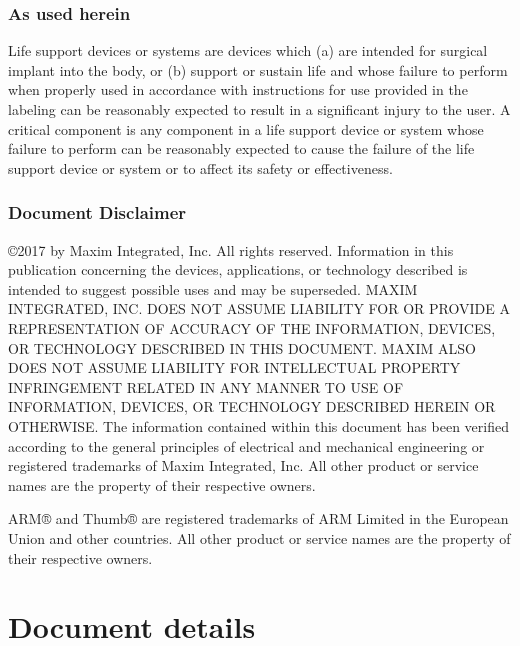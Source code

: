 \documentclass[twoside]{book}
\newcommand\docyear{2017 }
\newcommand{\+}{\discretionary{\mbox{\scriptsize$\hookleftarrow$}}{}{}}
\newcommand{\clearemptydoublepage}{%
  \newpage{\pagestyle{empty}\cleardoublepage}%
}
\let\cleardoublepage\clearpage
\begin{document}
\subsection*{As used herein}
Life support devices or systems are devices which (a) are intended for surgical implant into the body, or (b) support or sustain life and whose failure to perform when properly used in accordance with instructions for use provided in the labeling can be reasonably expected to result in a significant injury to the user. A critical component is any component in a life support device or system whose failure to perform can be reasonably expected to cause the failure of the life support device or system or to affect its safety or effectiveness.

\subsection*{Document Disclaimer}
©\docyear by Maxim Integrated, Inc. All rights reserved. Information in this publication concerning the devices, applications, or technology described is intended to suggest possible uses and may be superseded. MAXIM INTEGRATED, INC. DOES NOT ASSUME LIABILITY FOR OR PROVIDE A REPRESENTATION OF ACCURACY OF THE INFORMATION, DEVICES, OR TECHNOLOGY DESCRIBED IN THIS DOCUMENT. MAXIM ALSO DOES NOT ASSUME LIABILITY FOR INTELLECTUAL PROPERTY INFRINGEMENT RELATED IN ANY MANNER TO USE OF INFORMATION, DEVICES, OR TECHNOLOGY DESCRIBED HEREIN OR OTHERWISE. The information contained within this document has been verified according to the general principles of electrical and mechanical engineering or registered trademarks of Maxim Integrated, Inc. All other product or service names are the property of their respective owners.

ARM® and Thumb® are registered trademarks of ARM Limited in the European Union and other countries. All other product or service names are the property of their respective owners.


\clearemptydoublepage
{}
\tableofcontents
\clearemptydoublepage
{}
\hypersetup{pageanchor=true}


\chapter{Document details}


\end{document}
